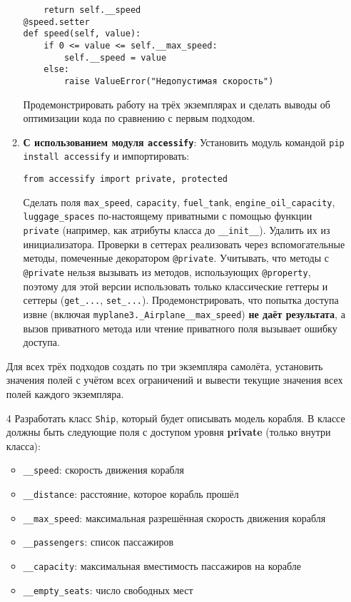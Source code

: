 \begin{enumerate}
\begin{enumerate}
\begin{verbatim}
    return self.__speed
@speed.setter
def speed(self, value):
    if 0 <= value <= self.__max_speed:
        self.__speed = value
    else:
        raise ValueError("Недопустимая скорость")
    \end{verbatim}  
    Продемонстрировать работу на трёх экземплярах и сделать выводы об оптимизации кода по сравнению с первым подходом.
    \item \textbf{С использованием модуля \texttt{accessify}}:  
    Установить модуль командой \texttt{pip install accessify} и импортировать:  
    \begin{verbatim}
from accessify import private, protected
    \end{verbatim}  
    Сделать поля \texttt{max\_speed}, \texttt{capacity}, \texttt{fuel\_tank}, \texttt{engine\_oil\_capacity}, \texttt{luggage\_spaces} по-настоящему приватными с помощью функции \texttt{private} (например, как атрибуты класса до \texttt{\_\_init\_\_}). Удалить их из инициализатора.  
    Проверки в сеттерах реализовать через вспомогательные методы, помеченные декоратором \texttt{@private}.  
    Учитывать, что методы с \texttt{@private} нельзя вызывать из методов, использующих \texttt{@property}, поэтому для этой версии использовать только классические геттеры и сеттеры (\texttt{get\_...}, \texttt{set\_...}).  
    Продемонстрировать, что попытка доступа извне (включая \texttt{myplane3.\_Airplane\_\_max\_speed}) \textbf{не даёт результата}, а вызов приватного метода или чтение приватного поля вызывает ошибку доступа.
\end{enumerate}
Для всех трёх подходов создать по три экземпляра самолёта, установить значения полей с учётом всех ограничений и вывести текущие значения всех полей каждого экземпляра.
\item[4] Разработать класс \texttt{Ship}, который будет описывать модель корабля. В классе должны быть следующие поля с доступом уровня \textbf{private} (только внутри класса):
\begin{itemize}
    \item \texttt{\_\_speed}: скорость движения корабля  
    \item \texttt{\_\_distance}: расстояние, которое корабль прошёл  
    \item \texttt{\_\_max\_speed}: максимальная разрешённая скорость движения корабля  
    \item \texttt{\_\_passengers}: список пассажиров  
    \item \texttt{\_\_capacity}: максимальная вместимость пассажиров на корабле  
    \item \texttt{\_\_empty\_seats}: число свободных мест  

\end{itemize}
\end{enumerate}
